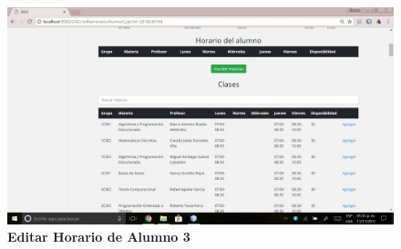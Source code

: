 \begin{figure}[H]
  \centering
    \includegraphics[scale=0.3]{project/images/editar_horario_alumno_03.jpg}
  \caption{\textbf{Editar Horario de Alumno 3}}
\end{figure}